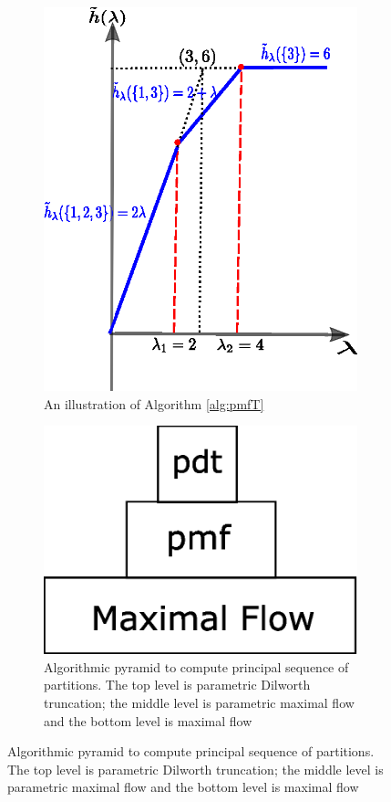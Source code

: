 \documentclass{article}
\begin{document}
\begin{figure}
	\centering
	\begin{subfigure}{0.45\textwidth}
		\includegraphics[width=\textwidth]{pic/example_pst_single.eps}
		\caption{An illustration of Algorithm \ref{alg:pmfT}}\label{fig:linseg}
	\end{subfigure}
	\begin{subfigure}{0.45\textwidth}
		\includegraphics[width=\textwidth]{pic/pdt.eps}
		\caption{Algorithmic pyramid to compute principal sequence of partitions. The top level is parametric Dilworth truncation; the middle level is parametric maximal flow and the bottom level is maximal flow}\label{fig:pyramid}
	\end{subfigure}
\end{figure}
\end{document}

